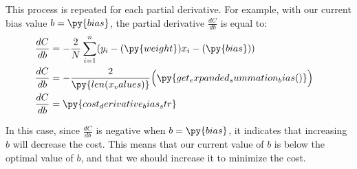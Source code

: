 \documentclass[12pt, demo]{article}
\begin{document}

This process is repeated for each partial derivative. For example, with our current bias value $b = \py{bias}$, the partial derivative $\frac{dC}{db}$ is equal to:
\begin{align*}
	\frac{dC}{db} & = -\frac{2}{N} \sum_{i=1}^{n} (y_i - (\py{weight})x_i - (\py{bias}))
	\\
	\frac{dC}{db} & =
	\begin{aligned}[t]
		-\frac{2}{\py{len(x_values)}}
		\Big( & \py{get_expanded_summation_bias()}\Big)
	\end{aligned}
	\\
	\frac{dC}{db} & = \py{cost_derivative_bias_str}
\end{align*}

In this case, since $\frac{dC}{db}$ is negative when $b = \py{bias}$, it indicates that increasing $b$ will decrease the cost. This means that our current value of $b$ is below the optimal value of $b$, and that we should increase it to minimize the cost.
\end{document}
